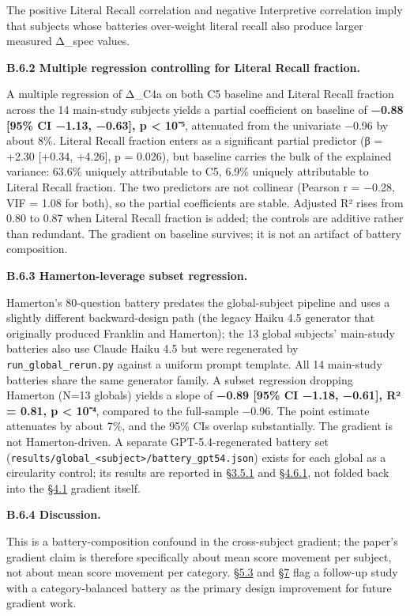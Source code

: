 The positive Literal Recall correlation and negative Interpretive
correlation imply that subjects whose batteries over-weight literal
recall also produce larger measured Δ\_spec values.

\textbf{B.6.2 Multiple regression controlling for Literal Recall
fraction.}

A multiple regression of Δ\_C4a on both C5 baseline and Literal Recall
fraction across the 14 main-study subjects yields a partial coefficient
on baseline of \textbf{−0.88 {[}95\% CI −1.13, −0.63{]}, p \textless{}
10⁻⁵}, attenuated from the univariate −0.96 by about 8\%. Literal Recall
fraction enters as a significant partial predictor (β = +2.30 {[}+0.34,
+4.26{]}, p = 0.026), but baseline carries the bulk of the explained
variance: 63.6\% uniquely attributable to C5, 6.9\% uniquely
attributable to Literal Recall fraction. The two predictors are not
collinear (Pearson r = −0.28, VIF = 1.08 for both), so the partial
coefficients are stable. Adjusted R² rises from 0.80 to 0.87 when
Literal Recall fraction is added; the controls are additive rather than
redundant. The gradient on baseline survives; it is not an artifact of
battery composition.

\textbf{B.6.3 Hamerton-leverage subset regression.}

Hamerton's 80-question battery predates the global-subject pipeline and
uses a slightly different backward-design path (the legacy Haiku 4.5
generator that originally produced Franklin and Hamerton); the 13 global
subjects' main-study batteries also use Claude Haiku 4.5 but were
regenerated by \texttt{run\_global\_rerun.py} against a uniform prompt
template. All 14 main-study batteries share the same generator family. A
subset regression dropping Hamerton (N=13 globals) yields a slope of
\textbf{−0.89 {[}95\% CI −1.18, −0.61{]}, R² = 0.81, p \textless{}
10⁻⁴}, compared to the full-sample −0.96. The point estimate attenuates
by about 7\%, and the 95\% CIs overlap substantially. The gradient is
not Hamerton-driven. A separate GPT-5.4-regenerated battery set
(\texttt{results/global\_\textless{}subject\textgreater{}/battery\_gpt54.json})
exists for each global as a circularity control; its results are
reported in \hyperref[circularity-controls]{§3.5.1} and \hyperref[cross-provider-response-generation-tier-2-replication]{§4.6.1}, not folded back into the \hyperref[the-cross-subject-gradient-and-its-per-question-mechanism]{§4.1} gradient
itself.

\textbf{B.6.4 Discussion.}

This is a battery-composition confound in the cross-subject gradient;
the paper's gradient claim is therefore specifically about mean score
movement per subject, not about mean score movement per category. \hyperref[retrieval-is-not-interpretation]{§5.3}
and \hyperref[future-work]{§7} flag a follow-up study with a category-balanced battery as the
primary design improvement for future gradient work.

